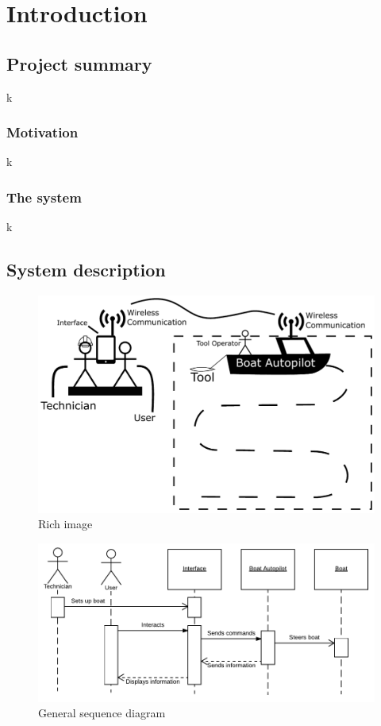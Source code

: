 \chapter{Introduction}

\section{Project summary}
k

\subsection{Motivation}
k

\subsection{The system}
k

\section{System description}
\begin{figure}[H]
	\centering
	\includegraphics[width=1\linewidth]{Images/Introduction/rich_image}
	\caption{Rich image}
\end{figure}

\begin{figure}[H]
	\centering
	\includegraphics[width=1\linewidth]{Images/Introduction/General_SD}
	\caption{General sequence diagram}
\end{figure}

